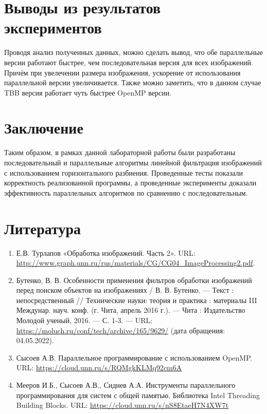 \documentclass{report}
\begin{document}
\newpage

\section*{Выводы из результатов экспериментов}
Проводя анализ полученных данных, можно сделать вывод, что обе параллельные версии работают быстрее, чем последовательная версия для всех изображений. Причём при увелечении размера изображения, ускорение от использования параллельной версии увеличивается. Также можно заметить, что в данном случае TBB версия работает чуть быстрее OpenMP версии.
\newpage

\section*{Заключение}
Таким образом, в рамках данной лабораторной работы были разработаны последовательный и параллельные алгоритмы линейной фильтрация изображений с использованием горизонтального разбиения. Проведенные тесты показали корректность реализованной программы, а проведенные эксперименты доказали эффективность параллельных алгоритмов по сравнению с последовательным.
\newpage

\section*{Литература}
\begin{enumerate}
\item Е.В. Турлапов «Обработка изображений. Часть 2». URL: \newline \url{http://www.graph.unn.ru/rus/materials/CG/CG04_ImageProcessing2.pdf}. 
\item Бутенко, В. В. Особенности применения фильтров обработки изображений перед поиском объектов на изображениях / В. В. Бутенко. — Текст : непосредственный // Технические науки: теория и практика : материалы III Междунар. науч. конф. (г. Чита, апрель 2016 г.). — Чита : Издательство Молодой ученый, 2016. — С. 1-3. — URL: \url{https://moluch.ru/conf/tech/archive/165/9629/} (дата обращения: 04.05.2022).
\item Сысоев А.В. Параллельное программирование с использованием OpenMP. URL: \newline
\url{https://cloud.unn.ru/s/RQMgkKLMq92cm6A}
\item Мееров И.Б., Сысоев А.В., Сиднев А.А. Инструменты параллельного программирования для систем с общей памятью. Библиотека Intel Threading Building Blocks. URL: \newline
\url{https://cloud.unn.ru/s/nS8EtaeH7N4XW7t}
\end{enumerate} 
\newpage
\end{document}
